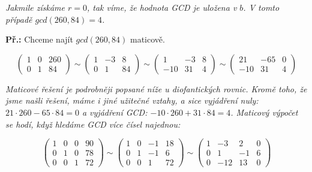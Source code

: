 \documentclass[10pt,a4paper]{article}
\begin{document}
\textit{Jakmile získáme $r = 0$, tak víme, že hodnota GCD je uložena v $b$. V tomto případě $gcd(260, 84) = 4$.}

\textbf{Př.:} Chceme najít $gcd(260, 84)$ maticově.

\[ \left( \begin{array}{cc|c}
1 & 0 & 260\\
0 & 1 & 84
\end{array} \right)
%
\sim
%
\left( \begin{array}{cc|c}
1 & -3 & 8\\
0 & 1 & 84
\end{array} \right)
%
\sim
%
\left( \begin{array}{cc|c}
1 & -3 & 8\\
-10 & 31 & 4
\end{array} \right)
%
\sim
%
\left( \begin{array}{cc|c}
21 & -65 & 0\\
-10 & 31 & 4
\end{array} \right)
\]

\textit{Maticové řešení je podrobněji popsané níže u diofantických rovnic. Kromě toho, že jsme našli řešení, máme i jiné užitečné vztahy, a sice vyjádření nuly: $21 \cdot 260 - 65 \cdot 84 = 0$ a vyjádření GCD: $-10 \cdot 260 + 31 \cdot 84 = 4$. Maticový výpočet se hodí, když hledáme GCD více čísel najednou:}

\[ \left( \begin{array}{ccc|c}
1 & 0 & 0 & 90\\
0 & 1 & 0 &  78\\
0 & 0 & 1 &  72
\end{array} \right)
%
\sim
%
\left( \begin{array}{ccc|c}
1 & 0 & -1 & 18\\
0 & 1 & -1 &  6\\
0 & 0 & 1 &  72
\end{array} \right)
%
\sim
%
\left( \begin{array}{ccc|c}
1 & -3 & 2 & 0\\
0 & 1 & -1 &  6\\
0 & -12 & 13 &  0
\end{array} \right)
\]
\end{document}
